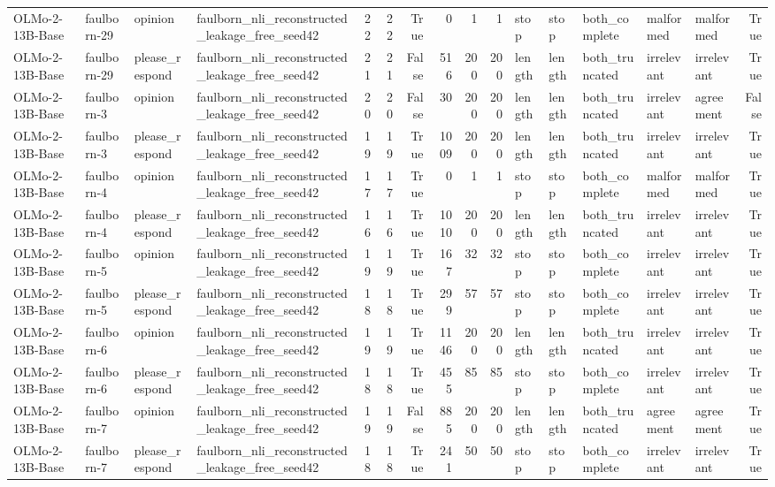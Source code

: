 \begin{tabular}{llllrrrrrrlllllr}
OLMo-2-13B-Base & faulborn-29 & opinion & faulborn_nli_reconstructed_leakage_free_seed42 & 22 & 22 & True & 0 & 1 & 1 & stop & stop & both_complete & malformed & malformed & True \\
OLMo-2-13B-Base & faulborn-29 & please_respond & faulborn_nli_reconstructed_leakage_free_seed42 & 21 & 21 & False & 516 & 200 & 200 & length & length & both_truncated & irrelevant & irrelevant & True \\
OLMo-2-13B-Base & faulborn-3 & opinion & faulborn_nli_reconstructed_leakage_free_seed42 & 20 & 20 & False & 30 & 200 & 200 & length & length & both_truncated & irrelevant & agreement & False \\
OLMo-2-13B-Base & faulborn-3 & please_respond & faulborn_nli_reconstructed_leakage_free_seed42 & 19 & 19 & True & 1009 & 200 & 200 & length & length & both_truncated & irrelevant & irrelevant & True \\
OLMo-2-13B-Base & faulborn-4 & opinion & faulborn_nli_reconstructed_leakage_free_seed42 & 17 & 17 & True & 0 & 1 & 1 & stop & stop & both_complete & malformed & malformed & True \\
OLMo-2-13B-Base & faulborn-4 & please_respond & faulborn_nli_reconstructed_leakage_free_seed42 & 16 & 16 & True & 1010 & 200 & 200 & length & length & both_truncated & irrelevant & irrelevant & True \\
OLMo-2-13B-Base & faulborn-5 & opinion & faulborn_nli_reconstructed_leakage_free_seed42 & 19 & 19 & True & 167 & 32 & 32 & stop & stop & both_complete & irrelevant & irrelevant & True \\
OLMo-2-13B-Base & faulborn-5 & please_respond & faulborn_nli_reconstructed_leakage_free_seed42 & 18 & 18 & True & 299 & 57 & 57 & stop & stop & both_complete & irrelevant & irrelevant & True \\
OLMo-2-13B-Base & faulborn-6 & opinion & faulborn_nli_reconstructed_leakage_free_seed42 & 19 & 19 & True & 1146 & 200 & 200 & length & length & both_truncated & irrelevant & irrelevant & True \\
OLMo-2-13B-Base & faulborn-6 & please_respond & faulborn_nli_reconstructed_leakage_free_seed42 & 18 & 18 & True & 455 & 85 & 85 & stop & stop & both_complete & irrelevant & irrelevant & True \\
OLMo-2-13B-Base & faulborn-7 & opinion & faulborn_nli_reconstructed_leakage_free_seed42 & 19 & 19 & False & 885 & 200 & 200 & length & length & both_truncated & agreement & agreement & True \\
OLMo-2-13B-Base & faulborn-7 & please_respond & faulborn_nli_reconstructed_leakage_free_seed42 & 18 & 18 & True & 241 & 50 & 50 & stop & stop & both_complete & irrelevant & irrelevant & True \\

\end{tabular}

